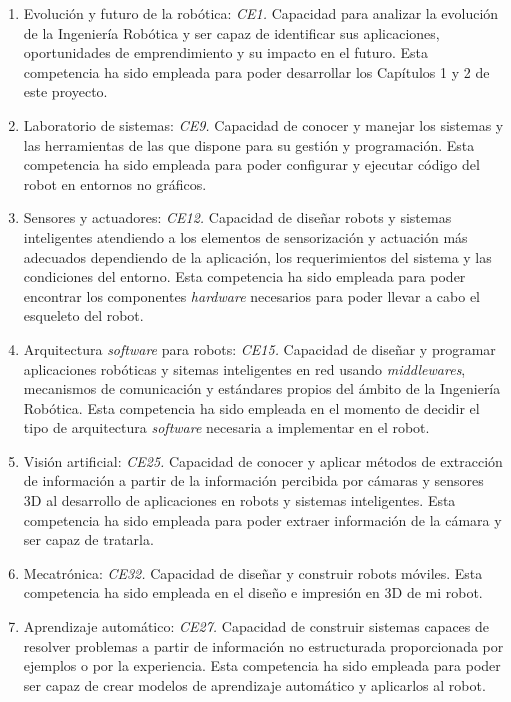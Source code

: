 \begin{enumerate}
	\item{Evolución y futuro de la robótica: \textit{CE1.} Capacidad para analizar la evolución de la Ingeniería Robótica y ser capaz de identificar sus aplicaciones, oportunidades de emprendimiento y su impacto en el futuro. 
	Esta competencia ha sido empleada para poder desarrollar los Capítulos 1 y 2 de este proyecto.}
	\item{Laboratorio de sistemas: \textit{CE9.} Capacidad de conocer y manejar los sistemas y las herramientas de las que dispone para su gestión y programación. 
	Esta competencia ha sido empleada para poder configurar y ejecutar código del robot en entornos no gráficos.}
	\item{Sensores y actuadores: \textit{CE12.} Capacidad de diseñar robots y sistemas inteligentes atendiendo a los elementos de sensorización y actuación más adecuados dependiendo de la aplicación, los requerimientos del sistema y las condiciones del entorno. 
	Esta competencia ha sido empleada para poder encontrar los componentes \textit{hardware} necesarios para poder llevar a cabo el esqueleto del robot.}
	\item{Arquitectura \textit{software} para robots: \textit{CE15.} Capacidad de diseñar y programar aplicaciones robóticas y sitemas inteligentes en red usando \textit{middlewares}, mecanismos de comunicación y estándares propios del ámbito de la Ingeniería Robótica. 
	Esta competencia ha sido empleada en el momento de decidir el tipo de arquitectura \textit{software} necesaria a implementar en el robot.}
	\item{Visión artificial: \textit{CE25.} Capacidad de conocer y aplicar métodos de extracción de información a partir de la información percibida por cámaras y sensores 3D al desarrollo de aplicaciones en robots y sistemas inteligentes. 
	Esta competencia ha sido empleada para poder extraer información de la cámara y ser capaz de tratarla.}
	\item{Mecatrónica: \textit{CE32.} Capacidad de diseñar y construir robots móviles. Esta competencia ha sido empleada en el diseño e impresión en 3D de mi robot.}
	\item{Aprendizaje automático: \textit{CE27.} Capacidad de construir sistemas capaces de resolver problemas a partir de información no estructurada proporcionada por ejemplos o por la experiencia. 
	Esta competencia ha sido empleada para poder ser capaz de crear modelos de aprendizaje automático y aplicarlos al robot.}
\end{enumerate}

